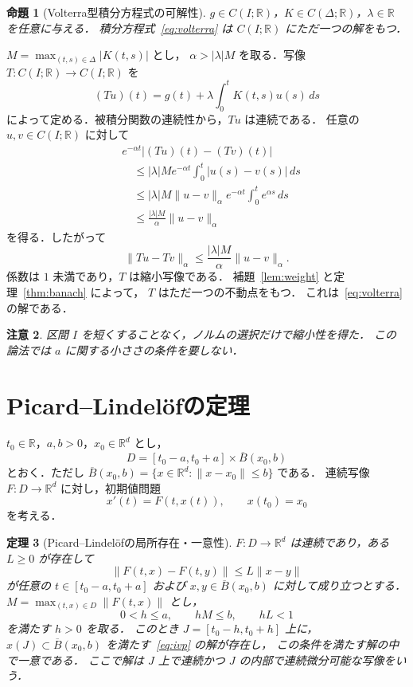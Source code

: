 \documentclass[a5paper,10pt,onecolumn]{jsarticle}
\makeatletter
\theoremstyle{mathnotetheorem}
\newtheorem{theorem}{定理}[section]
\newtheorem{proposition}[theorem]{命題}
\newtheorem{remark}[theorem]{注意}
\renewcommand{\proofname}{証明}
\renewenvironment{proof}[1][\proofname]{%
  \par\pushQED{\qed}\normalfont\topsep4\p@\@plus2\p@\relax
  \trivlist\item[\hskip\labelsep\bfseries #1]\ignorespaces
}{\popQED\endtrivlist\@endpefalse}
\newcommand{\R}{\mathbb{R}}
\newcommand{\norm}[1]{\lVert #1\rVert}
\newcommand{\abs}[1]{\lvert #1\rvert}
\makeatother
\begin{document}
\begin{proposition}[Volterra型積分方程式の可解性]\label{prop:volterra}
$g\in C(I;\R)$，$K\in C(\Delta;\R)$，$\lambda\in\R$ を任意に与える．
積分方程式~\eqref{eq:volterra} は $C(I;\R)$ にただ一つの解をもつ．
\end{proposition}

\begin{proof}
$M=\max_{(t,s)\in\Delta}\abs{K(t,s)}$ とし，
$\alpha>\abs{\lambda}M$ を取る．写像 $T:C(I;\R)\to C(I;\R)$ を
\[
 (Tu)(t)=g(t)+\lambda\int_0^t K(t,s)u(s)\,ds
\]
によって定める．被積分関数の連続性から，$Tu$ は連続である．
任意の $u,v\in C(I;\R)$ に対して
\begin{align*}
 &e^{-\alpha t}\abs{(Tu)(t)-(Tv)(t)}\\
 &\quad\le\abs{\lambda}M e^{-\alpha t}
       \int_0^t\abs{u(s)-v(s)}\,ds\\
 &\quad\le\abs{\lambda}M\norm{u-v}_{\alpha}
       e^{-\alpha t}\int_0^t e^{\alpha s}\,ds\\
 &\quad\le\frac{\abs{\lambda}M}{\alpha}\norm{u-v}_{\alpha}
\end{align*}
を得る．したがって
\[
 \norm{Tu-Tv}_{\alpha}\le
 \frac{\abs{\lambda}M}{\alpha}\norm{u-v}_{\alpha}.
\]
係数は $1$ 未満であり，$T$ は縮小写像である．
補題~\ref{lem:weight} と定理~\ref{thm:banach} によって，
$T$ はただ一つの不動点をもつ．
これは~\eqref{eq:volterra} の解である．
\end{proof}

\begin{remark}
区間 $I$ を短くすることなく，ノルムの選択だけで縮小性を得た．
この論法では $a$ に関する小ささの条件を要しない．
\end{remark}

\section{Picard--Lindel\"ofの定理}

$t_0\in\R$，$a,b>0$，$x_0\in\R^d$ とし，
\[
 D=[t_0-a,t_0+a]\times\overline{B}(x_0,b)
\]
とおく．ただし
$\overline{B}(x_0,b)=\{x\in\R^d:\norm{x-x_0}\le b\}$ である．
連続写像 $F:D\to\R^d$ に対し，初期値問題
\begin{equation}\label{eq:ivp}
 x'(t)=F(t,x(t)),\qquad x(t_0)=x_0
\end{equation}
を考える．

\begin{theorem}[Picard--Lindel\"ofの局所存在・一意性]\label{thm:picard}
$F:D\to\R^d$ は連続であり，ある $L\ge0$ が存在して
\[
 \norm{F(t,x)-F(t,y)}\le L\norm{x-y}
\]
が任意の $t\in[t_0-a,t_0+a]$ および
$x,y\in\overline{B}(x_0,b)$ に対して成り立つとする．
$M=\max_{(t,x)\in D}\norm{F(t,x)}$ とし，
\[
 0<h\le a,\qquad hM\le b,\qquad hL<1
\]
を満たす $h>0$ を取る．
このとき $J=[t_0-h,t_0+h]$ 上に，
$x(J)\subset\overline{B}(x_0,b)$ を満たす~\eqref{eq:ivp} の解が存在し，
この条件を満たす解の中で一意である．
ここで解は $J$ 上で連続かつ $J$ の内部で連続微分可能な写像をいう．
\end{theorem}
\end{document}

